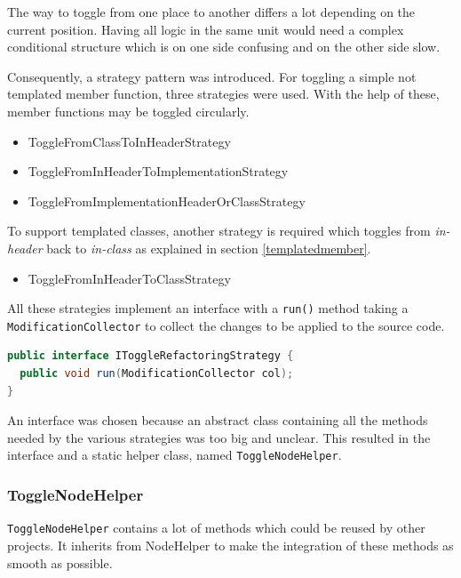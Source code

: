 The way to toggle from one place to another differs a lot depending on
the current position. Having all logic in the same unit would need a complex
conditional structure which is on one side confusing and on the other side
slow.

Consequently, a strategy pattern was introduced. For toggling a simple not
templated member function, three strategies were used. With the help of 
these, member functions may be toggled circularly.

\begin{itemize}
\item ToggleFromClassToInHeaderStrategy
\item ToggleFromInHeaderToImplementationStrategy
\item ToggleFromImplementationHeaderOrClassStrategy
\end{itemize}

To support templated classes, another strategy is required which toggles from
\textit{in-header} back to \textit{in-class} as explained in section
\ref{templatedmember}.

\begin{itemize}
\item ToggleFromInHeaderToClassStrategy
\end{itemize}

All these strategies implement an interface with a \texttt{run()} method taking
a \texttt{ModificationCollector} to collect the changes to be applied to the 
source code.

\begin{lstlisting}[caption={IToggleRefactoringStrategy},
label={01templatedMember}, language=Java]
public interface IToggleRefactoringStrategy {
  public void run(ModificationCollector col);
}
\end{lstlisting}

An interface was chosen because an abstract class containing all the methods
needed by the various strategies was too big and unclear. This resulted in the
interface and a static helper class, named \texttt{ToggleNodeHelper}.

\subsubsection{ToggleNodeHelper}

\texttt{ToggleNodeHelper} contains a lot of methods which could be reused by
other projects. It inherits from NodeHelper to make the integration of these
methods as smooth as possible.

